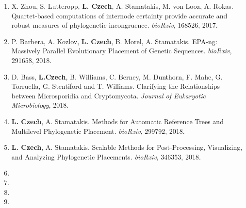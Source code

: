 \begin{enumerate}
    \item X. Zhou, S. Lutteropp, \textbf{L. Czech}, A. Stamatakis, M. von Looz, A. Rokas.
        Quartet-based computations of internode certainty provide accurate and robust measures of phylogenetic incongruence.
        \textit{bioRxiv}, 168526, 2017.

    \item P. Barbera, A. Kozlov, \textbf{L. Czech}, B. Morel, A. Stamatakis.
        EPA-ng: Massively Parallel Evolutionary Placement of Genetic Sequences.
        \textit{bioRxiv}, 291658, 2018.

    \item D. Bass, \textbf{L.Czech}, B. Williams, C. Berney, M. Dunthorn, F. Mahe, G. Torruella, G. Stentiford and T. Williams.
        Clarifying the Relationships between Microsporidia and Cryptomycota.
        \textit{Journal of Eukaryotic Microbiology}, 2018.

    \item \textbf{L. Czech}, A. Stamatakis.
        Methods for Automatic Reference Trees and Multilevel Phylogenetic Placement.
        \textit{bioRxiv}, 299792, 2018.

    \item \textbf{L. Czech}, A. Stamatakis.
        Scalable Methods for Post-Processing, Visualizing, and Analyzing Phylogenetic Placements.
        \textit{bioRxiv}, 346353, 2018.

    \item {}
    \item {}
    \item {}
    \item {}
\end{enumerate}

\clearpage
